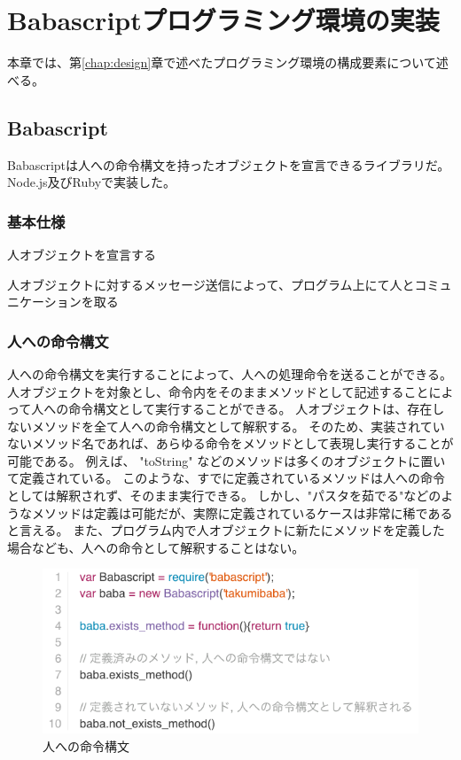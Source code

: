 \chapter{Babascriptプログラミング環境の実装}
\label{chap:implementation}

本章では、第\ref{chap:design}章で述べたプログラミング環境の構成要素について述べる。

\section{Babascript}\label{babascript}

Babascriptは人への命令構文を持ったオブジェクトを宣言できるライブラリだ。
Node.js及びRubyで実装した。

\subsection{基本仕様}\label{ux57faux672cux4ed5ux69d8}

人オブジェクトを宣言する

人オブジェクトに対するメッセージ送信によって、プログラム上にて人とコミュニケーションを取る

\subsection{人への命令構文}\label{ux4ebaux3078ux306eux547dux4ee4ux69cbux6587}

人への命令構文を実行することによって、人への処理命令を送ることができる。
人オブジェクトを対象とし、命令内をそのままメソッドとして記述することによって人への命令構文として実行することができる。
人オブジェクトは、存在しないメソッドを全て人への命令構文として解釈する。
そのため、実装されていないメソッド名であれば、あらゆる命令をメソッドとして表現し実行することが可能である。
例えば、 "toString"
などのメソッドは多くのオブジェクトに置いて定義されている。
このような、すでに定義されているメソッドは人への命令としては解釈されず、そのまま実行できる。
しかし、"パスタを茹でる"などのようなメソッドは定義は可能だが、実際に定義されているケースは非常に稀であると言える。
また、プログラム内で人オブジェクトに新たにメソッドを定義した場合なども、人への命令として解釈することはない。

\begin{figure}[htbp]
  \begin{center}
  \includegraphics[width=.8\linewidth,bb=0 0 577 253]{images/methodmissing_sample.js.png}
  \end{center}
  \caption{人への命令構文}
  \label{fig:methodmissing_sample}
\end{figure}

